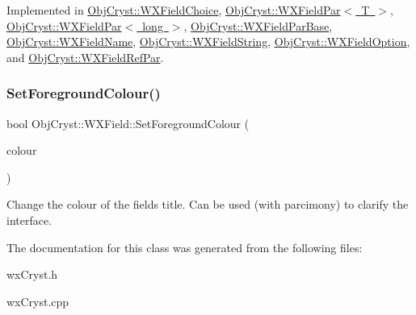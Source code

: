 Implemented in \mbox{\hyperlink{class_obj_cryst_1_1_w_x_field_choice_a3b923575bb9d616bd9c80a7929d0a388}{Obj\+Cryst\+::\+W\+X\+Field\+Choice}}, \mbox{\hyperlink{class_obj_cryst_1_1_w_x_field_par_a928b1b8c7d47e3e99a29975c4dd51d58}{Obj\+Cryst\+::\+W\+X\+Field\+Par$<$ T $>$}}, \mbox{\hyperlink{class_obj_cryst_1_1_w_x_field_par_a928b1b8c7d47e3e99a29975c4dd51d58}{Obj\+Cryst\+::\+W\+X\+Field\+Par$<$ long $>$}}, \mbox{\hyperlink{class_obj_cryst_1_1_w_x_field_par_base_a27fd5066d2f6b6e87e213439fd8f7311}{Obj\+Cryst\+::\+W\+X\+Field\+Par\+Base}}, \mbox{\hyperlink{class_obj_cryst_1_1_w_x_field_name_a59ce32e9b9860b6cc6a0833f9d96b753}{Obj\+Cryst\+::\+W\+X\+Field\+Name}}, \mbox{\hyperlink{class_obj_cryst_1_1_w_x_field_string_a0372d3d98cad5236fc2ebb628c881600}{Obj\+Cryst\+::\+W\+X\+Field\+String}}, \mbox{\hyperlink{class_obj_cryst_1_1_w_x_field_option_a8caf4ac439d8c702583ceda0612618ab}{Obj\+Cryst\+::\+W\+X\+Field\+Option}}, and \mbox{\hyperlink{class_obj_cryst_1_1_w_x_field_ref_par_acc2b6724451be954f41a64e09d6cf082}{Obj\+Cryst\+::\+W\+X\+Field\+Ref\+Par}}.

\mbox{\label{class_obj_cryst_1_1_w_x_field_a66cd13618de16d95beeb21e293678c87}} 
\subsubsection{\texorpdfstring{SetForegroundColour()}{SetForegroundColour()}}
{\footnotesize\ttfamily bool Obj\+Cryst\+::\+W\+X\+Field\+::\+Set\+Foreground\+Colour (\begin{DoxyParamCaption}\item[{const wx\+Colour \&}]{colour }\end{DoxyParamCaption})\hspace{0.3cm}{\ttfamily [virtual]}}

Change the colour of the field\textquotesingle{}s title. Can be used (with parcimony) to clarify the interface. 

The documentation for this class was generated from the following files\+:\begin{DoxyCompactItemize}
\item 
wx\+Cryst.\+h\item 
wx\+Cryst.\+cpp\end{DoxyCompactItemize}
